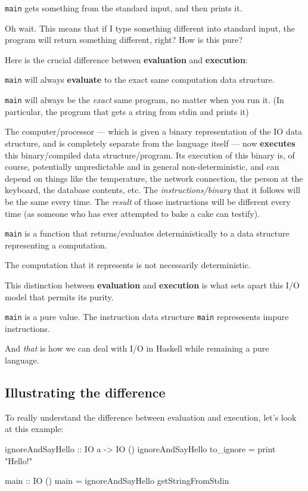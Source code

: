 \documentclass[]{article}
\newenvironment{Shaded}{}{}
\newcommand{\DataTypeTok}[1]{\textcolor[rgb]{0.56,0.13,0.00}{{#1}}}
\newcommand{\StringTok}[1]{\textcolor[rgb]{0.25,0.44,0.63}{{#1}}}
\newcommand{\OtherTok}[1]{\textcolor[rgb]{0.00,0.44,0.13}{{#1}}}
\newcommand{\FunctionTok}[1]{\textcolor[rgb]{0.02,0.16,0.49}{{#1}}}
\newcommand{\NormalTok}[1]{{#1}}
\begin{document}
\texttt{main} gets something from the standard input, and then prints it.

Oh wait. This means that if I type something different into standard input, the program will return
something different, right? How is this pure?

Here is the crucial difference between \textbf{evaluation} and \textbf{execution}:

\texttt{main} will always \textbf{evaluate} to the exact same computation data structure.

\texttt{main} will always be the \emph{exact} same program, no matter when you run it. (In
particular, the program that gets a string from stdin and prints it)

The computer/processor --- which is given a binary representation of the IO data structure, and is
completely separate from the language itself --- now \textbf{executes} this binary/compiled data
structure/program. Its execution of this binary is, of course, potentially unpredictable and in
general non-deterministic, and can depend on things like the temperature, the network connection,
the person at the keyboard, the database contents, etc. The \emph{instructions/binary} that it
follows will be the same every time. The \emph{result} of those instructions will be different every
time (as someone who has ever attempted to bake a cake can testify).

\texttt{main} is a function that returns/evaluates deterministically to a data structure
representing a computation.

The computation that it represents is not necessarily deterministic.

This distinction between \textbf{evaluation} and \textbf{execution} is what sets apart this I/O
model that permits its purity.

\texttt{main} is a pure value. The instruction data structure \texttt{main} represesents impure
instructions.

And \emph{that} is how we can deal with I/O in Haskell while remaining a pure language.

\subsection{Illustrating the difference}\label{illustrating-the-difference}

To really understand the difference between evaluation and execution, let's look at this example:

\begin{Shaded}
\begin{Highlighting}[]
\OtherTok{ignoreAndSayHello ::} \DataTypeTok{IO} \NormalTok{a }\OtherTok{->} \DataTypeTok{IO} \NormalTok{()}
\NormalTok{ignoreAndSayHello to_ignore }\FunctionTok{=} \NormalTok{print }\StringTok{"Hello!"}

\OtherTok{main ::} \DataTypeTok{IO} \NormalTok{()}
\NormalTok{main }\FunctionTok{=} \NormalTok{ignoreAndSayHello getStringFromStdin}
\end{Highlighting}
\end{Shaded}
\end{document}
